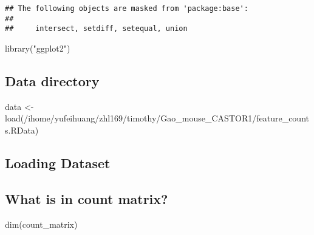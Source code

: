 \documentclass[
]{article}
\newenvironment{Shaded}{\begin{snugshade}}{\end{snugshade}}
\newcommand{\FunctionTok}[1]{\textcolor[rgb]{0.00,0.00,0.00}{#1}}
\newcommand{\NormalTok}[1]{#1}
\newcommand{\OtherTok}[1]{\textcolor[rgb]{0.56,0.35,0.01}{#1}}
\newcommand{\SpecialCharTok}[1]{\textcolor[rgb]{0.00,0.00,0.00}{#1}}
\newcommand{\StringTok}[1]{\textcolor[rgb]{0.31,0.60,0.02}{#1}}
\begin{document}
\begin{verbatim}
## The following objects are masked from 'package:base':
## 
##     intersect, setdiff, setequal, union
\end{verbatim}

\begin{Shaded}
\begin{Highlighting}[]
\FunctionTok{library}\NormalTok{(}\StringTok{"ggplot2"}\NormalTok{)}
\end{Highlighting}
\end{Shaded}

\hypertarget{data-directory}{%
\subsection{Data directory}\label{data-directory}}

\begin{Shaded}
\begin{Highlighting}[]
\NormalTok{data }\OtherTok{\textless{}{-}} \FunctionTok{load}\NormalTok{(}\StringTok{\textquotesingle{}/ihome/yufeihuang/zhl169/timothy/Gao\_mouse\_CASTOR1/feature\_counts.RData\textquotesingle{}}\NormalTok{)}
\end{Highlighting}
\end{Shaded}

\hypertarget{loading-dataset}{%
\subsection{Loading Dataset}\label{loading-dataset}}

\begin{Shaded}
\end{Shaded}

\hypertarget{what-is-in-count-matrix}{%
\subsection{What is in count matrix?}\label{what-is-in-count-matrix}}

\begin{Shaded}
\begin{Highlighting}[]
\FunctionTok{dim}\NormalTok{(count\_matrix)}
\end{Highlighting}
\end{Shaded}
\end{document}
